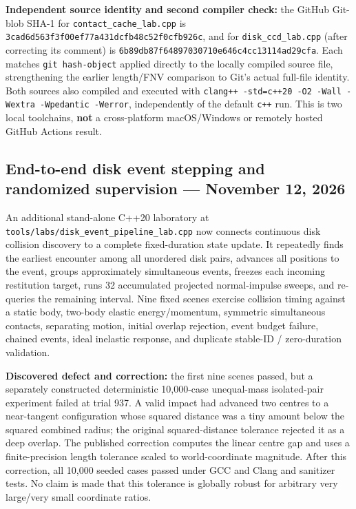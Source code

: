 \textbf{Independent source identity and second compiler check:} the GitHub Git-blob SHA-1 for \texttt{contact\_cache\_lab.cpp} is \texttt{3cad6d563f3f00ef77a431dcfb48c52f0cfb926c}, and for \texttt{disk\_ccd\_lab.cpp} (after correcting its comment) is \texttt{6b89db87f64897030710e646c4cc13114ad29cfa}. Each matches \texttt{git\ hash-object} applied directly to the locally compiled source file, strengthening the earlier length/FNV comparison to Git's actual full-file identity. Both sources also compiled and executed with \texttt{clang++\ -std=c++20\ -O2\ -Wall\ -Wextra\ -Wpedantic\ -Werror}, independently of the default \texttt{c++} run. This is two local toolchains, \textbf{not} a cross-platform macOS/Windows or remotely hosted GitHub Actions result.

\subsection{End-to-end disk event stepping and randomized supervision --- November 12, 2026}\label{appendix-3b67654799a2-end-to-end-disk-event-stepping-and-randomized-supervision-november-12-2026}

An additional stand-alone C++20 laboratory at \texttt{tools/labs/disk\_event\_pipeline\_lab.cpp} now connects continuous disk collision discovery to a complete fixed-duration state update. It repeatedly finds the earliest encounter among all unordered disk pairs, advances all positions to the event, groups approximately simultaneous events, freezes each incoming restitution target, runs 32 accumulated projected normal-impulse sweeps, and re-queries the remaining interval. Nine fixed scenes exercise collision timing against a static body, two-body elastic energy/momentum, symmetric simultaneous contacts, separating motion, initial overlap rejection, event budget failure, chained events, ideal inelastic response, and duplicate stable-ID / zero-duration validation.

\textbf{Discovered defect and correction:} the first nine scenes passed, but a separately constructed deterministic 10,000-case unequal-mass isolated-pair experiment failed at trial 937. A valid impact had advanced two centres to a near-tangent configuration whose squared distance was a tiny amount below the squared combined radius; the original squared-distance tolerance rejected it as a deep overlap. The published correction computes the linear centre gap and uses a finite-precision length tolerance scaled to world-coordinate magnitude. After this correction, all 10,000 seeded cases passed under GCC and Clang and sanitizer tests. No claim is made that this tolerance is globally robust for arbitrary very large/very small coordinate ratios.


